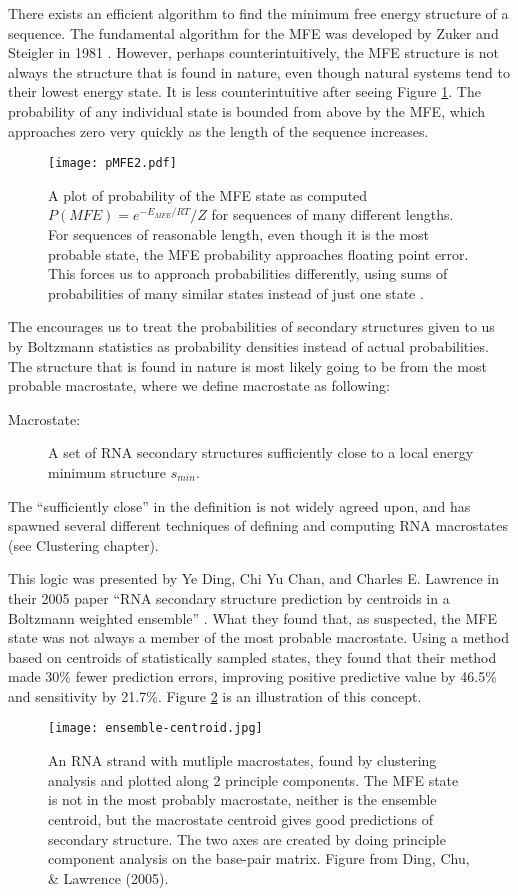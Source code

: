 There exists an efficient algorithm to find the minimum free energy
structure of a sequence. The fundamental algorithm for the MFE was
developed by Zuker and Steigler in 1981
\cite{zuker1981optimal}. However, perhaps counterintuitively, the MFE
structure is not always the structure that is found in nature, even
though natural systems tend to their lowest energy state. It is less
counterintuitive after seeing Figure \ref{fig:probMFE}. The
probability of any individual state is bounded from above by the MFE,
which approaches zero very quickly as the length of the sequence
increases.
\begin{figure}[t]
\centering
\texttt{[image: pMFE2.pdf]}
\caption{A plot of probability of the MFE state as computed $P(MFE) =
  e^{-E_{MFE}/RT}/Z$ for sequences of many different lengths. For
  sequences of reasonable length, even though it is the most probable
  state, the MFE probability approaches floating point error. This
  forces us to approach probabilities differently, using sums of
  probabilities of many similar states instead of just one
  state \cite{aalbertsCommunication}.}
\label{fig:probMFE}
\end{figure}
The encourages us to treat the probabilities of secondary structures
given to us by Boltzmann statistics as probability densities instead
of actual probabilities. The structure that is found in nature is most
likely going to be from the most probable macrostate, where we define
macrostate as following:
\begin{description}
\item[Macrostate:] A set of RNA secondary structures sufficiently
  close to a local energy minimum structure $s_{min}$. 
\end{description}
The ``sufficiently close'' in the definition is not widely agreed
upon, and has spawned several different techniques of defining and
computing RNA macrostates (see Clustering chapter).

This logic was presented by Ye Ding, Chi Yu Chan, and Charles
E. Lawrence in their 2005 paper ``RNA secondary structure prediction
by centroids in a Boltzmann weighted ensemble''
\cite{ding2005rna}. What they found that, as suspected, the MFE state
was not always a member of the most probable macrostate. Using a
method based on centroids of statistically sampled states, they found
that their method made 30\% fewer prediction errors, improving
positive predictive value by 46.5\% and sensitivity by 21.7\%. Figure
\ref{fig:centroidFig} is an illustration of this concept.
\begin{figure}[t]
\centering
\texttt{[image: ensemble-centroid.jpg]}
\caption{An RNA strand with mutliple macrostates, found by clustering
  analysis and plotted along 2 principle components. The MFE state is
  not in the most probably macrostate, neither is the ensemble
  centroid, but the macrostate centroid gives good predictions of
  secondary structure. The two axes are created by doing principle
  component analysis on the base-pair matrix. Figure from Ding, Chu,
  \& Lawrence (2005).}
\label{fig:centroidFig}
\end{figure}

